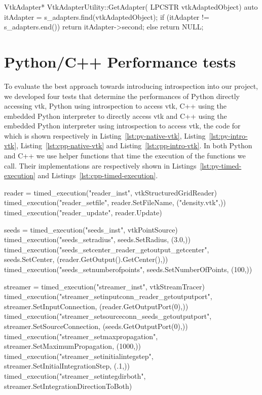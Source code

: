 \begin{appendices}
\begin{cpp}[label=lst:vtkadapterutilityex,caption={Example VtkAdapterUtility.cpp},aboveskip=20pt]
VtkAdapter* VtkAdapterUtility::GetAdapter(
	LPCSTR vtkAdaptedObject)
{
	auto itAdapter = s_adapters.find(vtkAdaptedObject);
	if (itAdapter != s_adapters.end())
	{
		return itAdapter->second;
	}
	else
	{
		return NULL;
	}
}
\end{cpp}
    
\chapter{Python/C++ Performance tests}
\label{apx:streamtracer-performance-tests}

To evaluate the best approach towards introducing introspection into our project, we developed four tests that determine the performances of Python directly accessing \acrshort{vtk}, Python using introspection to access \acrshort{vtk}, C++ using the embedded Python interpreter to directly access \acrshort{vtk} and C++ using the embedded Python interpreter using introspection to access \acrshort{vtk}, the code for which is shown respectively in Listing~\ref{lst:py-native-vtk}, Listing~\ref{lst:py-intro-vtk}, Listing~\ref{lst:cpp-native-vtk} and Listing~\ref{lst:cpp-intro-vtk}. In both Python and C++ we use helper functions that time the execution of the functions we call. Their implementations are respectively shown in Listings~\ref{lst:py-timed-execution} and Listings~\ref{lst:cpp-timed-execution}.

\begin{python}[label=lst:py-native-vtk,caption={Native Python VTK benchmark script},aboveskip=20pt]
reader = timed_execution("reader_inst", vtkStructuredGridReader)
timed_execution("reader_setfile", reader.SetFileName, ("density.vtk",))
timed_execution("reader_update", reader.Update)

seeds = timed_execution("seeds_inst", vtkPointSource)
timed_execution("seeds_setradius", seeds.SetRadius, (3.0,))
timed_execution("seeds_setcenter_reader_getoutput_getcenter", seeds.SetCenter, (reader.GetOutput().GetCenter(),))
timed_execution("seeds_setnumberofpoints", seeds.SetNumberOfPoints, (100,))

streamer = timed_execution("streamer_inst", vtkStreamTracer)
timed_execution("streamer_setinputconn_reader_getoutputport", streamer.SetInputConnection, (reader.GetOutputPort(0),))
timed_execution("streamer_setsourceconn_seeds_getoutputport", streamer.SetSourceConnection, (seeds.GetOutputPort(0),))
timed_execution("streamer_setmaxpropagation", streamer.SetMaximumPropagation, (1000,))
timed_execution("streamer_setinitialintegstep", streamer.SetInitialIntegrationStep, (.1,))
timed_execution("streamer_setintegdirboth", streamer.SetIntegrationDirectionToBoth)


\end{python}
\end{appendices}
